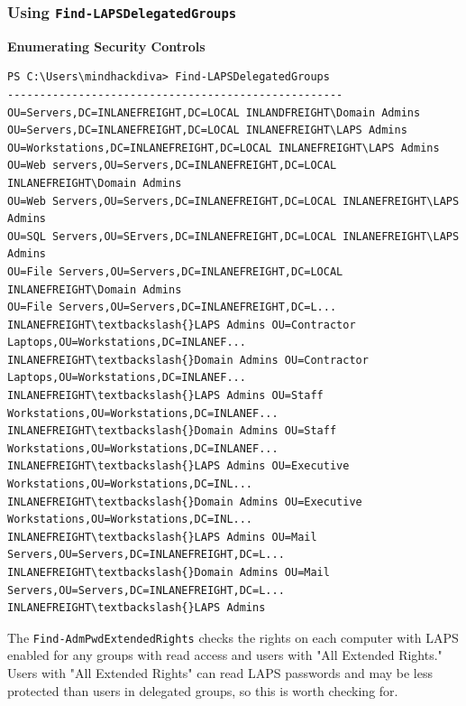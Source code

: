 \subsubsection{Using \texttt{Find-LAPSDelegatedGroups}}
\textbf{Enumerating Security Controls}
\begin{notebox}
\begin{verbatim}
PS C:\Users\mindhackdiva> Find-LAPSDelegatedGroups
----------------------------------------------------OU=Servers,DC=INLANEFREIGHT,DC=LOCAL INLANDFREIGHT\Domain Admins
OU=Servers,DC=INLANEFREIGHT,DC=LOCAL INLANEFREIGHT\LAPS Admins
OU=Workstations,DC=INLANEFREIGHT,DC=LOCAL INLANEFREIGHT\LAPS Admins
OU=Web servers,OU=Servers,DC=INLANEFREIGHT,DC=LOCAL INLANEFREIGHT\Domain Admins
OU=Web Servers,OU=Servers,DC=INLANEFREIGHT,DC=LOCAL INLANEFREIGHT\LAPS Admins
OU=SQL Servers,OU=SErvers,DC=INLANEFREIGHT,DC=LOCAL INLANEFREIGHT\LAPS Admins
OU=File Servers,OU=Servers,DC=INLANEFREIGHT,DC=LOCAL INLANEFREIGHT\Domain Admins
OU=File Servers,OU=Servers,DC=INLANEFREIGHT,DC=L... INLANEFREIGHT\textbackslash{}LAPS Admins OU=Contractor Laptops,OU=Workstations,DC=INLANEF... INLANEFREIGHT\textbackslash{}Domain Admins OU=Contractor Laptops,OU=Workstations,DC=INLANEF... INLANEFREIGHT\textbackslash{}LAPS Admins OU=Staff Workstations,OU=Workstations,DC=INLANEF... INLANEFREIGHT\textbackslash{}Domain Admins OU=Staff Workstations,OU=Workstations,DC=INLANEF... INLANEFREIGHT\textbackslash{}LAPS Admins OU=Executive Workstations,OU=Workstations,DC=INL... INLANEFREIGHT\textbackslash{}Domain Admins OU=Executive Workstations,OU=Workstations,DC=INL... INLANEFREIGHT\textbackslash{}LAPS Admins OU=Mail Servers,OU=Servers,DC=INLANEFREIGHT,DC=L... INLANEFREIGHT\textbackslash{}Domain Admins OU=Mail Servers,OU=Servers,DC=INLANEFREIGHT,DC=L... INLANEFREIGHT\textbackslash{}LAPS Admins 
\end{verbatim}
\end{notebox}

The \texttt{Find-AdmPwdExtendedRights} checks the rights on each computer with LAPS enabled for any groups with read access and users with "All Extended Rights." Users with "All Extended Rights" can read LAPS passwords and may be less protected than users in delegated groups, so this is worth checking for.

